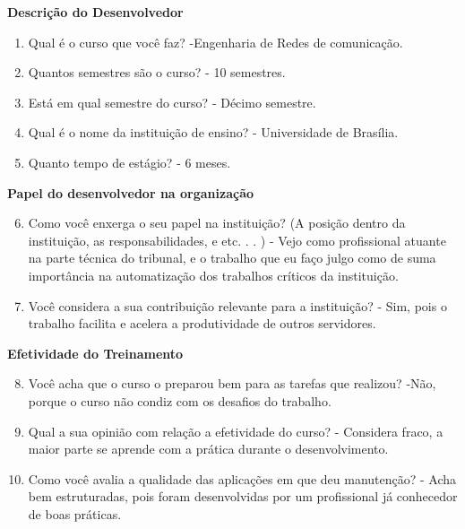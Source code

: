 \begin{apendicesenv}
\textbf{Descrição do Desenvolvedor}

\begin{enumerate}
	\item Qual é o curso que você faz?\newline
	-Engenharia de Redes de comunicação.
	\item Quantos semestres são o curso?\newline
	- 10 semestres.
	\item Está em qual semestre do curso?\newline
	- Décimo semestre.
	\item Qual é o nome da instituição de ensino?\newline
	- Universidade de Brasília.
	\item Quanto tempo de estágio?\newline
	- 6 meses.
\end{enumerate}

\textbf{Papel do desenvolvedor na organização}

\begin{enumerate}
	\setcounter{enumi}{5}
	\item Como você enxerga o seu papel na instituição? (A posição dentro da instituição, as
	responsabilidades, e etc. . . )\newline
	- Vejo como profissional atuante na parte técnica do tribunal, e o trabalho que eu faço julgo como de suma importância na automatização dos trabalhos críticos da instituição.
	\item Você considera a sua contribuição relevante para a instituição?\newline
	- Sim, pois o trabalho facilita e acelera a produtividade de outros servidores.
\end{enumerate}

\textbf{Efetividade do Treinamento}

\begin{enumerate}
	\setcounter{enumi}{7}
	\item Você acha que o curso o preparou bem para as tarefas que realizou?\newline
	-Não, porque o curso não condiz com os desafios do trabalho.
	\item Qual a sua opinião com relação a efetividade do curso?\newline
	- Considera fraco, a maior parte se aprende com a prática durante o desenvolvimento.
	\item Como você avalia a qualidade das aplicações em que deu manutenção?\newline
	- Acha bem estruturadas, pois foram desenvolvidas por um profissional já conhecedor de boas práticas.
\end{enumerate}


\end{apendicesenv}
